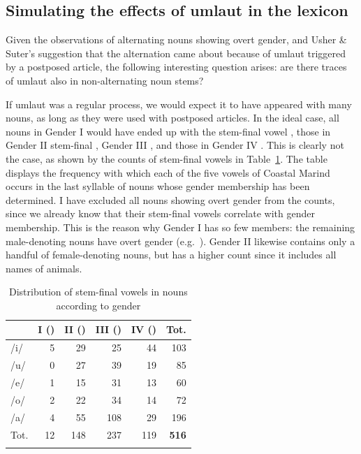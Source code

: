 \documentclass[output=collectionpaper]{langsci/langscibook}
\begin{document}
\subsection{Simulating the effects of umlaut in the lexicon}
Given the observations of alternating nouns showing overt gender, and Usher \& Suter's suggestion that the alternation came about because of umlaut triggered by a postposed article, the following interesting question arises: are there traces of umlaut also in non-alternating noun stems?

If umlaut was a regular process, we would expect it to have appeared with many nouns, as long as they were used with postposed articles. In the ideal case, all nouns in Gender I would have ended up with the stem-final vowel , those in Gender II stem-final , Gender III , and those in Gender IV . This is clearly not the case, as shown by the counts of stem-final vowels in Table~\ref{table:Bruno:numbers}. The table displays the frequency with which each of the five vowels of Coastal Marind occurs in the last syllable of nouns whose gender membership has been determined. I have excluded all nouns showing overt gender from the counts, since we already know that their stem-final vowels correlate with gender membership. This is the reason why Gender I has so few members: the remaining male-denoting nouns have overt gender (e.g.\ ). Gender II likewise contains only a handful of female-denoting nouns, but has a higher count since it includes all names of animals.


\begin{table}
\centering
\begin{tabular}{lrrrrr}
\lsptoprule
	& I (\mar{e})	& II (\mar{u})	& III (\mar{a})	& IV (\mar{i}) & Tot.\\
\midrule
/i/	&5	&29	&25	&\cellcolor{lsLightGray}44 & 103\\
/u/	&0	&\cellcolor{lsLightGray}27	&39	&19 & 85\\
/e/	&1	&15	&31	&13 & 60\\
/o/	&2	&22	&34	&14 & 72\\
/a/	&4	&55	&\cellcolor{lsLightGray}108	&29 & 196\\
\midrule
Tot.	&12	&148	&237	&119 & \textbf{516}\\
\lspbottomrule
\end{tabular}
\caption{Distribution of stem-final vowels in nouns according to gender}
\label{table:Bruno:numbers}
\end{table}
\end{document}
